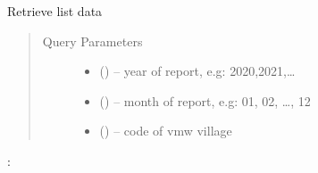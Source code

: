 \documentclass[letterpaper,10pt,english,openany,oneside]{sphinxmanual}
\begin{document}
\begin{fulllineitems}
\label{\detokenize{api/v4:get--api4-VMWFollowup-list}}
\sphinxAtStartPar
Retrieve list data
\begin{quote}\begin{description}
\item[{Query Parameters}] \leavevmode\begin{itemize}
\item {} 
\sphinxAtStartPar
{} () – year of report, e.g: 2020,2021,…

\item {} 
\sphinxAtStartPar
{} () – month of report, e.g: 01, 02, …, 12

\item {} 
\sphinxAtStartPar
{} () – code of vmw village

\end{itemize}

\end{description}\end{quote}

\sphinxAtStartPar
{}:


\end{fulllineitems}
\end{document}

